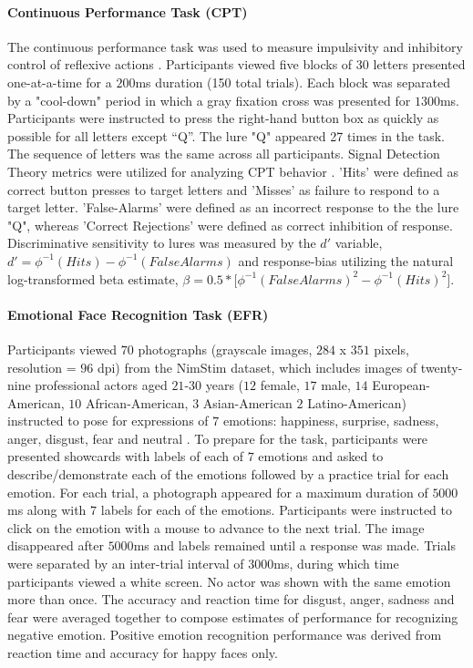 \documentclass[utf8]{frontiersSCNS} %
\begin{document}
\paragraph{Continuous Performance Task (CPT)} The continuous performance task was used to measure impulsivity and inhibitory control of reflexive actions \citep{horn2003response}.  Participants viewed five blocks of $30$ letters presented one-at-a-time for a $200$ms duration (150 total trials). Each block was separated by a "cool-down" period in which a gray fixation cross was presented for $1300$ms. Participants were instructed to press the right-hand button box as quickly as possible for all letters except “Q”. The lure "Q" appeared 27 times in the task. The sequence of letters was the same across all participants.  Signal Detection Theory metrics were utilized for analyzing CPT behavior \cite{stanislaw1999calculation}. 'Hits' were defined as correct button presses to target letters and 'Misses' as failure to respond to a target letter. 'False-Alarms' were defined as an incorrect response to the the lure "Q", whereas 'Correct Rejections' were defined as correct inhibition of response. Discriminative sensitivity to lures was measured by the $d'$ variable, $d'=\phi^{-1}( Hits ) - \phi^{-1}( False Alarms )$ and response-bias utilizing the natural log-transformed beta estimate, $ \beta = 0.5*\Big[\phi^{-1}(FalseAlarms)^{2} - \phi^{-1}(Hits)^{2}\Big]$. 
\paragraph{Emotional Face Recognition Task (EFR)} Participants viewed $70$ photographs (grayscale images, $284$ x $351$ pixels, resolution = $96$ dpi) from the NimStim dataset, which includes images of twenty-nine professional actors aged $21$-$30$ years ($12$ female, $17$ male, $14$ European-American, $10$ African-American, $3$ Asian-American $2$ Latino-American) instructed to pose for expressions of $7$ emotions: happiness, surprise, sadness, anger, disgust, fear and neutral \citep{tottenham2009nimstim}. To prepare for the task, participants were presented showcards with labels of each of $7$ emotions and asked to describe/demonstrate each of the emotions followed by a practice trial for each emotion. For each trial, a photograph appeared for a maximum duration of $5000$ms along with $7$ labels for each of the emotions. Participants were instructed to click on the emotion with a mouse to advance to the next trial. The image disappeared after $5000$ms and labels remained until a response was made. Trials were separated by an inter-trial interval of $3000$ms, during which time participants viewed a white screen. No actor was shown with the same emotion more than once. The accuracy and reaction time for disgust, anger, sadness and fear were averaged together to compose estimates of performance for recognizing negative emotion. Positive emotion recognition performance was derived from reaction time and accuracy for happy faces only. 
\end{document}
